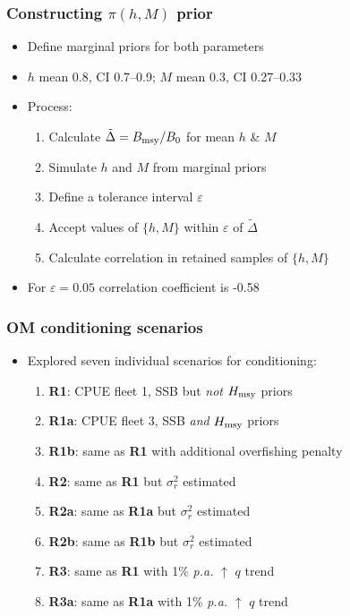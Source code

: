 \documentclass{beamer}
\newcommand{\veps}{\varepsilon}
\newcommand{\sigr}{\sigma^2_r}
\newcommand{\tdel}{\tilde\Delta}
\newcommand{\bmsy}{B_{\rm msy}}
\newcommand{\hmsy}{H_{\rm msy}}
\begin{document}
\begin{frame}
\frametitle{Constructing $\pi(h,M)$ prior}
\begin{itemize}
    \item Define marginal priors for both parameters
    \item $h$ mean 0.8, CI 0.7--0.9; $M$ mean 0.3, CI 0.27--0.33
    \item Process:
        \vspace{0.2cm}
        \begin{enumerate}
            \item Calculate $\tdel=\bmsy/B_0$ for mean $h$ \& $M$
            \item Simulate $h$ and $M$ from marginal priors
            \item Define a tolerance interval $\veps$
            \item Accept values of $\{h,M\}$ within $\veps$ of $\tdel$
            \item Calculate correlation in retained samples of $\{h,M\}$
        \end{enumerate}
        \vspace{0.2cm}
    \item For $\veps=0.05$ correlation coefficient is -0.58
\end{itemize}
\end{frame}

\begin{frame}
\frametitle{OM conditioning scenarios}
\begin{itemize}
  \item Explored seven individual scenarios for conditioning:
  \vspace{0.25cm}
  \begin{enumerate}
      \item \textbf{R1}: CPUE fleet 1, SSB but \emph{not} $\hmsy$ priors
      \item \textbf{R1a}: CPUE fleet 3, SSB \emph{and} $\hmsy$ priors 
      \item \textbf{R1b}: same as \textbf{R1} with additional overfishing penalty
      \item \textbf{R2}: same as \textbf{R1} but $\sigr$ estimated
      \item \textbf{R2a}: same as \textbf{R1a} but $\sigr$ estimated 
      \item \textbf{R2b}: same as \textbf{R1b} but $\sigr$ estimated 
      \item \textbf{R3}: same as \textbf{R1} with 1\% \textit{p.a.} $\uparrow$ $q$ trend
      \item \textbf{R3a}: same as \textbf{R1a} with 1\% \textit{p.a.} $\uparrow$ $q$ trend
  \end{enumerate}
\end{itemize}
\end{frame}
\end{document}
